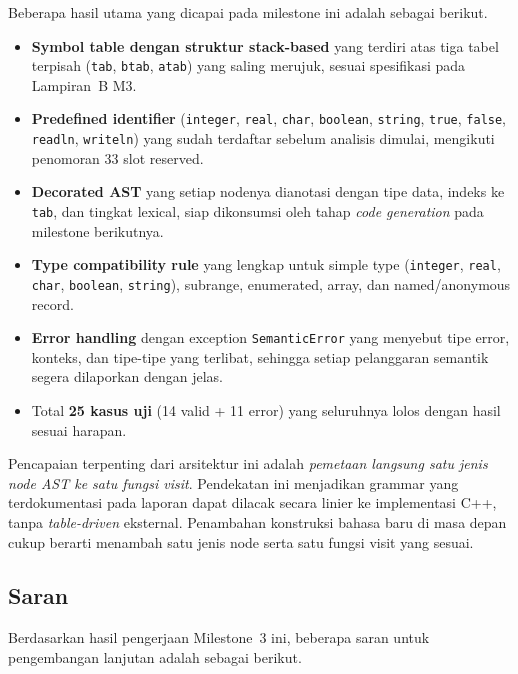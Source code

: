 \documentclass[11pt,a4paper]{article}
\begin{document}
Beberapa hasil utama yang dicapai pada milestone ini adalah sebagai berikut.

\begin{itemize}
    \item \textbf{Symbol table dengan struktur stack-based} yang terdiri atas
          tiga tabel terpisah (\texttt{tab}, \texttt{btab}, \texttt{atab})
          yang saling merujuk, sesuai spesifikasi pada Lampiran~B M3.
    \item \textbf{Predefined identifier} (\texttt{integer}, \texttt{real},
          \texttt{char}, \texttt{boolean}, \texttt{string}, \texttt{true},
          \texttt{false}, \texttt{readln}, \texttt{writeln}) yang sudah
          terdaftar sebelum analisis dimulai, mengikuti penomoran 33 slot
          reserved.
    \item \textbf{Decorated AST} yang setiap nodenya dianotasi dengan tipe
          data, indeks ke \texttt{tab}, dan tingkat lexical, siap dikonsumsi
          oleh tahap \textit{code generation} pada milestone berikutnya.
    \item \textbf{Type compatibility rule} yang lengkap untuk simple type
          (\texttt{integer}, \texttt{real}, \texttt{char}, \texttt{boolean},
          \texttt{string}), subrange, enumerated, array, dan named/anonymous
          record.
    \item \textbf{Error handling} dengan exception \texttt{SemanticError}
          yang menyebut tipe error, konteks, dan tipe-tipe yang terlibat,
          sehingga setiap pelanggaran semantik segera dilaporkan dengan jelas.
    \item Total \textbf{25 kasus uji} (14 valid + 11 error) yang seluruhnya
          lolos dengan hasil sesuai harapan.
\end{itemize}

Pencapaian terpenting dari arsitektur ini adalah \textit{pemetaan langsung
satu jenis node AST ke satu fungsi visit}. Pendekatan ini menjadikan grammar
yang terdokumentasi pada laporan dapat dilacak secara linier ke implementasi
C++, tanpa \textit{table-driven} eksternal. Penambahan konstruksi bahasa
baru di masa depan cukup berarti menambah satu jenis node serta satu fungsi
visit yang sesuai.

\subsection{Saran}

Berdasarkan hasil pengerjaan Milestone~3 ini, beberapa saran untuk
pengembangan lanjutan adalah sebagai berikut.
\end{document}
